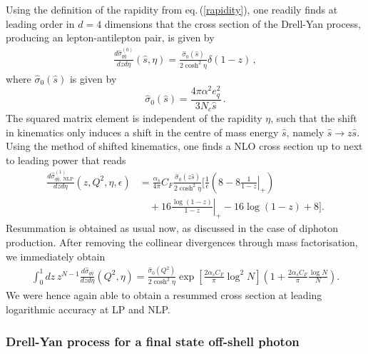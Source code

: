 \documentclass[11pt]{article}
\newcommand{\nn}{\nonumber}
\newcommand{\s}{\hat{s}}
\newcommand\eqn[1]     {eq.\,(\ref{#1})}
\begin{document}
Using the definition of the rapidity from \eqn{rapidity}, one readily finds at leading order in $d=4$  dimensions that the cross section of the Drell-Yan process, producing an lepton-antilepton pair, is given by 
\begin{align}
    \frac{d\hat{\sigma}^{(0)}_{q\bar{q}}}{dzd\eta}(\s,\eta) = \frac{\hat\sigma_0(\s)}{2\cosh^2\eta}\delta(1-z)\,,
\end{align}
where $\hat\sigma_0(\s)$ is given by 
\begin{equation}
    \hat\sigma_0(\s) = \frac{4\pi\alpha^2e_q^2}{3N_c\s}\,.
\end{equation}
The squared matrix element is independent of the rapidity $\eta$, such that the shift in kinematics only induces a shift in the centre of mass energy $\s$, namely $\s\to z\s$. Using the method of shifted kinematics, one finds a NLO cross section up to next to leading power that reads
\begin{align}
    \frac{d\hat{\sigma}^{(1)}_{q\bar{q},\text{ NLP}}}{dzd\eta}(z,Q^2,\eta,\epsilon) &= \frac{\alpha_s}{4\pi}C_F\frac{\hat\sigma_0(z\s)}{2\cosh^2\eta}\Bigg[\frac{1}{\epsilon}\left(8-8\left.\frac{1}{1-z}\right\vert_+\right)\nn\\
    &\quad+16\left.\frac{\log(1-z)}{1-z}\right\vert_+-16\log(1-z)+8\Bigg].
\end{align}
Resummation is obtained as usual now, as discussed in the case of diphoton production. After removing the collinear divergences through mass factorisation, we immediately obtain
\begin{align}
    \int_0^1dz\, z^{N-1}\frac{d\hat\sigma_{q\bar{q}}}{dzd\eta}(Q^2,\eta)=\frac{\hat\sigma_0(Q^2)}{2\cosh^2\eta}\exp\left[\frac{2\alpha_sC_F}{\pi}\log^2N\right]\left(1+\frac{2\alpha_sC_F}{\pi}\frac{\log N}{N}\right).
\end{align}
We were hence again able to obtain a resummed cross section at leading logarithmic accuracy at LP and NLP.

\subsubsection{Drell-Yan process for a final state off-shell photon}\label{subsec:DYgamma}
\end{document}
